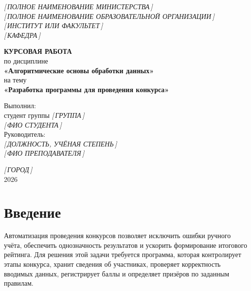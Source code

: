 \documentclass[14pt,a4paper]{extarticle}
\newcommand{\placeholder}[1]{\textit{[\,#1\,]}}
\begin{document}
\begin{titlepage}
\begin{center}
\placeholder{ПОЛНОЕ НАИМЕНОВАНИЕ МИНИСТЕРСТВА}\\
\placeholder{ПОЛНОЕ НАИМЕНОВАНИЕ ОБРАЗОВАТЕЛЬНОЙ ОРГАНИЗАЦИИ}\\
\placeholder{ИНСТИТУТ ИЛИ ФАКУЛЬТЕТ}\\
\placeholder{КАФЕДРА}
\end{center}

\vfill

\begin{center}
\textbf{КУРСОВАЯ РАБОТА}\\[1.5\baselineskip]
по дисциплине\\
\textbf{«Алгоритмические основы обработки данных»}\\[1.5\baselineskip]
на тему\\
\textbf{«Разработка программы для проведения конкурса»}
\end{center}

\vfill

\begin{flushright}
\begin{minipage}{0.46\textwidth}
Выполнил:\\
студент группы \placeholder{ГРУППА}\\
\placeholder{ФИО СТУДЕНТА}\\[1.2\baselineskip]
Руководитель:\\
\placeholder{ДОЛЖНОСТЬ, УЧЁНАЯ СТЕПЕНЬ}\\
\placeholder{ФИО ПРЕПОДАВАТЕЛЯ}
\end{minipage}
\end{flushright}

\vfill

\begin{center}
\placeholder{ГОРОД}\\
2026
\end{center}
\end{titlepage}

\setcounter{page}{2}
\tableofcontents
\clearpage

\section*{Введение}

Автоматизация проведения конкурсов позволяет исключить ошибки ручного учёта, обеспечить однозначность результатов и ускорить формирование итогового рейтинга. Для решения этой задачи требуется программа, которая контролирует этапы конкурса, хранит сведения об участниках, проверяет корректность вводимых данных, регистрирует баллы и определяет призёров по заданным правилам.
\end{document}
